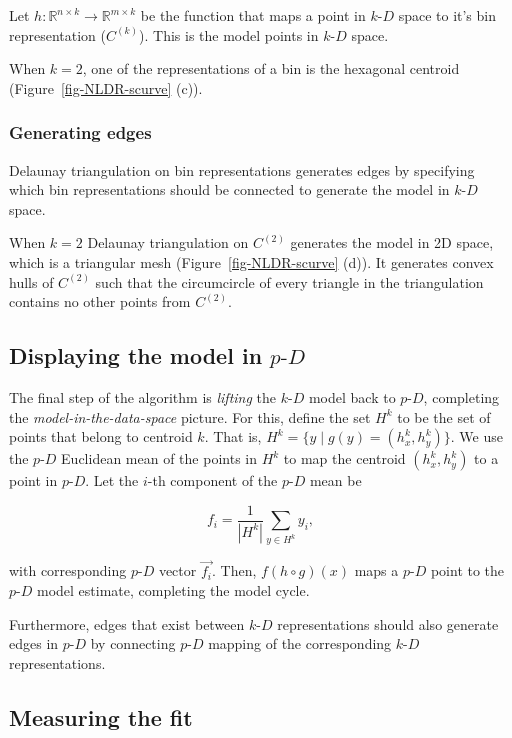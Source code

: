 \documentclass[
  12pt]{article}
\newcommand\pD{$p\text{-}D$}
\newcommand\kD{$k\text{-}D$}
\begin{document}
Let \(h : \mathbb{R}^{n\times k} \rightarrow \mathbb{R}^{m\times k}\) be
the function that maps a point in \kD{} space to it's bin representation
(\(C^{(k)}\)). This is the model points in \kD{} space.

When \(k = 2\), one of the representations of a bin is the hexagonal
centroid (Figure~\ref{fig-NLDR-scurve} (c)).

\subsubsection{Generating edges}\label{generating-edges}

Delaunay triangulation on bin representations generates edges by
specifying which bin representations should be connected to generate the
model in \kD{} space.

When \(k = 2\) Delaunay triangulation on \(C^{(2)}\) generates the model
in 2D space, which is a triangular mesh (Figure~\ref{fig-NLDR-scurve}
(d)). It generates convex hulls of \(C^{(2)}\) such that the
circumcircle of every triangle in the triangulation contains no other
points from \(C^{(2)}\).

\subsection{\texorpdfstring{Displaying the model in
\pD{}}{Displaying the model in }}\label{displaying-the-model-in}

The final step of the algorithm is \emph{lifting} the \kD{} model back
to \pD{}, completing the \emph{model-in-the-data-space} picture. For
this, define the set \(H^k\) to be the set of points that belong to
centroid \(k\). That is, \(H^k = \{ y \; | \; g(y) = (h_x^k, h_y^k)\}\).
We use the \pD{} Euclidean mean of the points in \(H^k\) to map the
centroid \((h_x^k, h_y^k)\) to a point in \pD{}. Let the \(i\)-th
component of the \pD{} mean be

\[f_i = \frac{1}{\left|H^k\right|}\sum_{y \in H^k} y_i,\]

with corresponding \pD{} vector \(\vec{f_i}\). Then, \(f(h\circ g)(x)\)
maps a \pD{} point to the \pD{} model estimate, completing the model
cycle.

Furthermore, edges that exist between \kD{} representations should also
generate edges in \pD{} by connecting \pD{} mapping of the corresponding
\kD{} representations.

\subsection{Measuring the fit}\label{measuring-the-fit}
\end{document}
